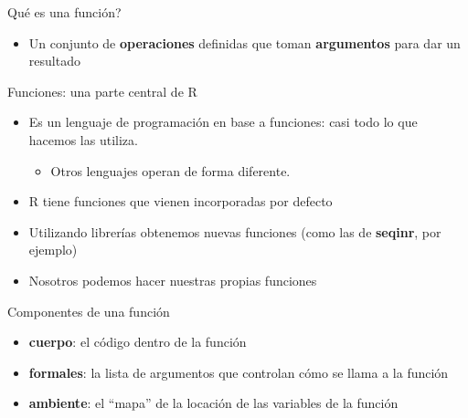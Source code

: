 \documentclass[ignorenonframetext,]{beamer}
\providecommand{\tightlist}{%
  \setlength{\itemsep}{0pt}\setlength{\parskip}{0pt}}
\begin{document}
\begin{frame}{Qué es una función?}
\protect\hypertarget{quuxe9-es-una-funciuxf3n}{}

\begin{itemize}
\tightlist
\item
  Un conjunto de \textbf{operaciones} definidas que toman
  \textbf{argumentos} para dar un resultado
\end{itemize}

\end{frame}

\begin{frame}{Funciones: una parte central de R}
\protect\hypertarget{funciones-una-parte-central-de-r}{}

\begin{itemize}
\tightlist
\item
  Es un lenguaje de programación en base a funciones: casi todo lo que
  hacemos las utiliza.

  \begin{itemize}
  \tightlist
  \item
    Otros lenguajes operan de forma diferente.
  \end{itemize}
\item
  R tiene funciones que vienen incorporadas por defecto
\item
  Utilizando librerías obtenemos nuevas funciones (como las de
  \textbf{seqinr}, por ejemplo)
\item
  Nosotros podemos hacer nuestras propias funciones
\end{itemize}

\end{frame}

\begin{frame}{Componentes de una función}
\protect\hypertarget{componentes-de-una-funciuxf3n}{}

\begin{itemize}
\tightlist
\item
  \textbf{cuerpo}: el código dentro de la función
\item
  \textbf{formales}: la lista de argumentos que controlan cómo se llama
  a la función
\item
  \textbf{ambiente}: el ``mapa'' de la locación de las variables de la
  función
\end{itemize}

\end{frame}
\end{document}
